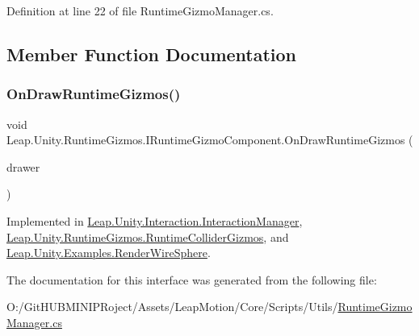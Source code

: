 Definition at line 22 of file Runtime\+Gizmo\+Manager.\+cs.



\subsection{Member Function Documentation}
\mbox{\label{interface_leap_1_1_unity_1_1_runtime_gizmos_1_1_i_runtime_gizmo_component_abaa7cf174480d957b48d0023df50291d}} 
\subsubsection{\texorpdfstring{OnDrawRuntimeGizmos()}{OnDrawRuntimeGizmos()}}
{\footnotesize\ttfamily void Leap.\+Unity.\+Runtime\+Gizmos.\+I\+Runtime\+Gizmo\+Component.\+On\+Draw\+Runtime\+Gizmos (\begin{DoxyParamCaption}\item[{\mbox{\hyperlink{class_leap_1_1_unity_1_1_runtime_gizmos_1_1_runtime_gizmo_drawer}{Runtime\+Gizmo\+Drawer}}}]{drawer }\end{DoxyParamCaption})}



Implemented in \mbox{\hyperlink{class_leap_1_1_unity_1_1_interaction_1_1_interaction_manager_ad85d00ee53f6c8569a27ffbc1c582724}{Leap.\+Unity.\+Interaction.\+Interaction\+Manager}}, \mbox{\hyperlink{class_leap_1_1_unity_1_1_runtime_gizmos_1_1_runtime_collider_gizmos_af781c99e4d3b838bfc69d5733071a936}{Leap.\+Unity.\+Runtime\+Gizmos.\+Runtime\+Collider\+Gizmos}}, and \mbox{\hyperlink{class_leap_1_1_unity_1_1_examples_1_1_render_wire_sphere_afc935457f41e834980d3b143125fc2e6}{Leap.\+Unity.\+Examples.\+Render\+Wire\+Sphere}}.



The documentation for this interface was generated from the following file\+:\begin{DoxyCompactItemize}
\item 
O\+:/\+Git\+H\+U\+B\+M\+I\+N\+I\+P\+Roject/\+Assets/\+Leap\+Motion/\+Core/\+Scripts/\+Utils/\mbox{\hyperlink{_runtime_gizmo_manager_8cs}{Runtime\+Gizmo\+Manager.\+cs}}\end{DoxyCompactItemize}
